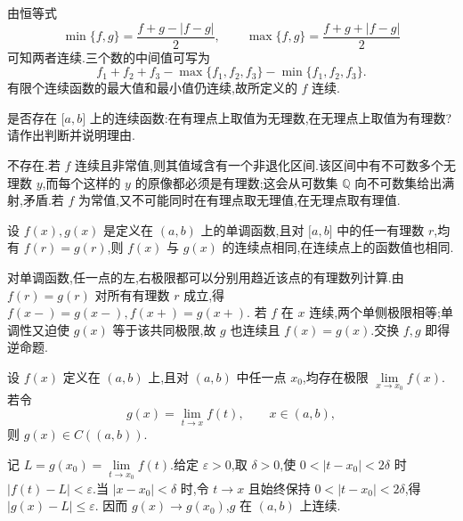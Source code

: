 \begin{solution}
    由恒等式
    \[
        \min\{f,g\}=\dfrac{f+g-|f-g|}{2},\qquad \max\{f,g\}=\dfrac{f+g+|f-g|}{2}
    \]
    可知两者连续.三个数的中间值可写为
    \[
        f_1+f_2+f_3-\max\{f_1,f_2,f_3\}-\min\{f_1,f_2,f_3\}.
    \]
    有限个连续函数的最大值和最小值仍连续,故所定义的 $f$ 连续.
\end{solution}

\begin{example}
    是否存在 $\lbrack a,b\rbrack$ 上的连续函数:在有理点上取值为无理数,在无理点上取值为有理数?请作出判断并说明理由.
\end{example}
\exampleblank

\begin{solution}
    不存在.若 $f$ 连续且非常值,则其值域含有一个非退化区间.该区间中有不可数多个无理数 $y$,而每个这样的 $y$ 的原像都必须是有理数;这会从可数集 $\mathbb{Q}$ 向不可数集给出满射,矛盾.若 $f$ 为常值,又不可能同时在有理点取无理值,在无理点取有理值.
\end{solution}

\begin{example}
    设 $f(x),g(x)$ 是定义在 $(a,b)$ 上的单调函数,且对 $\lbrack a,b\rbrack$ 中的任一有理数 $r$,均有 $f(r)=g(r)$,则 $f(x)$ 与 $g(x)$ 的连续点相同,在连续点上的函数值也相同.
\end{example}
\exampleblank

\begin{solution}
    对单调函数,任一点的左,右极限都可以分别用趋近该点的有理数列计算.由 $f(r)=g(r)$ 对所有有理数 $r$ 成立,得 $f(x-)=g(x-),f(x+)=g(x+)$.
    若 $f$ 在 $x$ 连续,两个单侧极限相等;单调性又迫使 $g(x)$ 等于该共同极限,故 $g$ 也连续且 $f(x)=g(x)$.交换 $f,g$ 即得逆命题.
\end{solution}

\begin{example}
    设 $f(x)$ 定义在 $(a,b)$ 上,且对 $(a,b)$ 中任一点 $x_0$,均存在极限 $\displaystyle\lim\limits_{x\to x_0}f(x)$.若令
    \[
        g(x)=\lim\limits_{t\to x}f(t), \qquad x\in(a,b),
    \]
    则 $g(x)\in C((a,b))$.
\end{example}
\exampleblank

\begin{solution}
    记 $L=g(x_0)=\displaystyle\lim\limits_{t\to x_0}f(t)$.给定 $\varepsilon>0$,取 $\delta>0$,使 $0<|t-x_0|<2\delta$ 时 $|f(t)-L|<\varepsilon$.当 $|x-x_0|<\delta$ 时,令 $t\to x$ 且始终保持 $0<|t-x_0|<2\delta$,得 $|g(x)-L|\leq\varepsilon$.
    因而 $g(x)\to g(x_0)$,$g$ 在 $(a,b)$ 上连续.
\end{solution}



